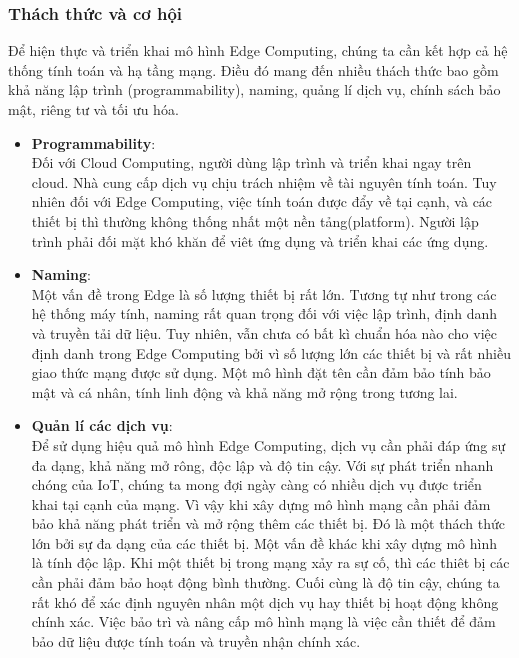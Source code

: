 \documentclass[a4paper]{report}
\begin{document}
\subsubsection{Thách thức và cơ hội}
Để hiện thực và triển khai mô hình Edge Computing, chúng ta cần kết hợp cả hệ thống tính toán và hạ tầng mạng. Điều đó mang đến nhiều thách thức bao gồm khả năng lập trình (programmability), naming, quảng lí dịch vụ, chính sách bảo mật, riêng tư và tối ưu hóa.
\begin{itemize}
\item \textbf{Programmability}:\\

Đối với Cloud Computing, người dùng lập trình và triển khai ngay trên cloud. Nhà cung cấp dịch vụ chịu trách nhiệm về tài nguyên tính toán. Tuy nhiên đối với Edge Computing, việc tính toán được đẩy về tại cạnh, và các thiết bị thì thường không thống nhất một nền tảng(platform). Người lập trình phải đối mặt khó khăn để viêt ứng dụng và triển khai các ứng dụng.

\item \textbf{Naming}:\\

Một vấn đề trong Edge là số lượng thiết bị rất lớn. Tương tự như trong các hệ thống máy tính, naming rất quan trọng đối với việc lập trình, định danh và truyền tải dữ liệu. Tuy nhiên, vẫn chưa có bất kì chuẩn hóa nào cho việc định danh trong Edge Computing bởi vì số lượng lớn các thiết bị và rất nhiều giao thức mạng được sử dụng. Một mô hình đặt tên cần đảm bảo tính bảo mật và cá nhân, tính linh động và khả năng mở rộng trong tương lai.


\item \textbf{Quản lí các dịch vụ}:\\

Để sử dụng hiệu quả mô hình Edge Computing, dịch vụ cần phải đáp ứng sự đa dạng, khả năng mở rông, độc lập và độ tin cậy. Với sự phát triển nhanh chóng của IoT, chúng ta mong đợi ngày càng có nhiều dịch vụ được triển khai tại cạnh của mạng. Vì vậy khi xây dựng mô hình mạng cần phải đảm bảo khả năng phát triển và mở rộng thêm các thiết bị. Đó là một thách thức lớn bởi sự đa dạng của các thiết bị. Một vấn đề khác khi xây dựng mô hình là tính độc lập. Khi một thiết bị trong mạng xảy ra sự cố, thì các thiêt bị các cần phải đảm bảo hoạt động bình thường. Cuối cùng là độ tin cậy, chúng ta rất khó để xác định nguyên nhân một dịch vụ hay thiết bị hoạt động không chính xác. Việc bảo trì và nâng cấp mô hình mạng là việc cần thiết để đảm bảo dữ liệu được tính toán và truyền nhận chính xác.


\end{itemize}
\end{document}
